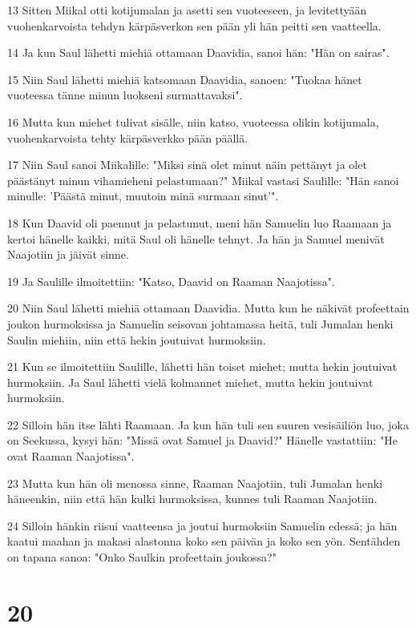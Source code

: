 \par 13 Sitten Miikal otti kotijumalan ja asetti sen vuoteeseen, ja levitettyään vuohenkarvoista tehdyn kärpäsverkon sen pään yli hän peitti sen vaatteella.
\par 14 Ja kun Saul lähetti miehiä ottamaan Daavidia, sanoi hän: "Hän on sairas".
\par 15 Niin Saul lähetti miehiä katsomaan Daavidia, sanoen: "Tuokaa hänet vuoteessa tänne minun luokseni surmattavaksi".
\par 16 Mutta kun miehet tulivat sisälle, niin katso, vuoteessa olikin kotijumala, vuohenkarvoista tehty kärpäsverkko pään päällä.
\par 17 Niin Saul sanoi Miikalille: "Miksi sinä olet minut näin pettänyt ja olet päästänyt minun vihamieheni pelastumaan?" Miikal vastasi Saulille: "Hän sanoi minulle: 'Päästä minut, muutoin minä surmaan sinut'".
\par 18 Kun Daavid oli paennut ja pelastunut, meni hän Samuelin luo Raamaan ja kertoi hänelle kaikki, mitä Saul oli hänelle tehnyt. Ja hän ja Samuel menivät Naajotiin ja jäivät sinne.
\par 19 Ja Saulille ilmoitettiin: "Katso, Daavid on Raaman Naajotissa".
\par 20 Niin Saul lähetti miehiä ottamaan Daavidia. Mutta kun he näkivät profeettain joukon hurmoksissa ja Samuelin seisovan johtamassa heitä, tuli Jumalan henki Saulin miehiin, niin että hekin joutuivat hurmoksiin.
\par 21 Kun se ilmoitettiin Saulille, lähetti hän toiset miehet; mutta hekin joutuivat hurmoksiin. Ja Saul lähetti vielä kolmannet miehet, mutta hekin joutuivat hurmoksiin.
\par 22 Silloin hän itse lähti Raamaan. Ja kun hän tuli sen suuren vesisäiliön luo, joka on Seekussa, kysyi hän: "Missä ovat Samuel ja Daavid?" Hänelle vastattiin: "He ovat Raaman Naajotissa".
\par 23 Mutta kun hän oli menossa sinne, Raaman Naajotiin, tuli Jumalan henki häneenkin, niin että hän kulki hurmoksissa, kunnes tuli Raaman Naajotiin.
\par 24 Silloin hänkin riisui vaatteensa ja joutui hurmoksiin Samuelin edessä; ja hän kaatui maahan ja makasi alastonna koko sen päivän ja koko sen yön. Sentähden on tapana sanoa: "Onko Saulkin profeettain joukossa?"

\chapter{20}

